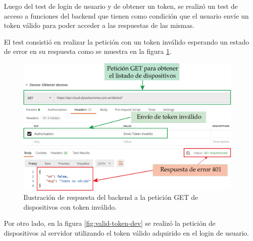 \pagebreak
Luego del test de login de usuario y de obtener un token, se realizó un test de acceso a funciones del backend que tienen como condición que el usuario envíe un token válido para poder acceder a las respuestas de las mismas. 

El test consistió en realizar la petición con un token inválido esperando un estado de error en su respuesta como se muestra en la figura \ref{fig:not-token-dev}.  

\begin{figure}[htpb]
	\centering
	\includegraphics[scale=.90]{./Figures/devices-no-token.png}
	\caption[Respuesta a petición de dispositivos con token inválido]{Ilustración de respuesta del backend a la petición GET de dispositivos con token inválido.}
	\label{fig:not-token-dev}
\end{figure}

\newpage

Por otro lado, en la figura  \ref{fig:valid-token-dev} se realizó la petición de dispositivos al servidor utilizando el token válido adquirido en el login de usuario.



